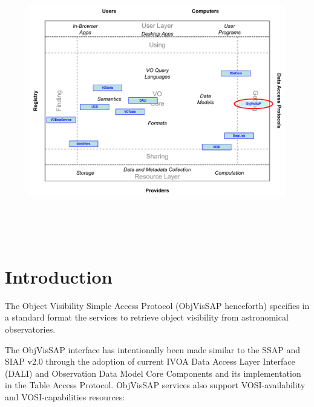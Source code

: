 \documentclass[11pt,a4paper]{ivoa}
\begin{document}

\begin{figure}[H]
\advance\leftskip 0.0in
\includegraphics[width=6.0in,height=4.73in]{./role_diagram.pdf}
\end{figure}


\pagebreak



\section{Introduction}\label{section:_Toc415497365}


The Object Visibility Simple Access Protocol (ObjVisSAP henceforth)
specifies in a standard format the services to retrieve object
visibility from astronomical observatories.



The ObjVisSAP interface has intentionally been made similar to the SSAP
\citep{2012ivoa.spec.0210T} and SIAP v2.0 \citep{2015ivoa.spec.0617D} through the adoption
of current IVOA Data Access Layer Interface (DALI) and Observation Data
Model Core Components \citep{2017ivoa.spec.0509L} and its implementation in
the Table Access Protocol. ObjVisSAP services also support
VOSI-availability and VOSI-capabilities resources:
\end{document}
